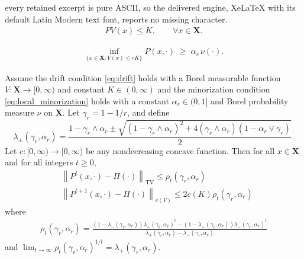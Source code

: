 \documentclass[10pt,a4paper]{amsart}
\newcommand{\X}{\textbf{X}}
\begin{document}
every retained excerpt is pure ASCII, so the delivered engine, XeLaTeX with its default Latin Modern text font, reports no missing character.
\begin{align}
P V(x) \le K, \qquad \forall x \in \X.
\label{eq:drift}
\end{align}

\begin{align}
\inf_{\{x \in \X : V(x) \le rK\}} P(x, \cdot) \;\ge\; \alpha_r \, \nu(\cdot).
\label{eq:local_minorization}
\end{align}

\begin{theorem}  \label{thm:convergence_sharp}
Assume the drift condition \eqref{eq:drift} holds with a Borel measurable function $V : \X \to [0, \infty)$ and constant $K \in (0,\infty)$ and the minorization condition \eqref{eq:local_minorization} holds with a constant $\alpha_r \in (0, 1]$ and Borel probability measure $\nu$ on $\X$.
Let $\gamma_r = 1 - 1/r$, and define
\[
\lambda_{\pm}(\gamma_r, \alpha_r)
= \frac{1 - \gamma_r \wedge \alpha_r \pm \sqrt{ (1 - \gamma_r \wedge \alpha_r)^2 + 4 ( \gamma_r \wedge \alpha_r ) (1 - \alpha_r \vee \gamma_r) } }{2}.
\]
Let $c : [0, \infty) \to [0, \infty)$ be any nondecreasing concave function.
Then for all $x \in \X$ and for all integers $t \ge 0$,
\begin{align*}
&\left\| P^{t}(x, \cdot) - \Pi(\cdot) \right\|_{\mathrm{TV}}
\le \rho_t(\gamma_r, \alpha_r)
\\
&\left\| P^{t + 1}(x, \cdot) - \Pi(\cdot) \right\|_{c(V)}
\le 2 c(K) \rho_{t}(\gamma_r, \alpha_r)
\end{align*}
where
\begin{align}
\rho_{t}(\gamma_r, \alpha_r)
= \frac{(1 - \lambda_{-}(\gamma_r, \alpha_r)) \lambda_{+}(\gamma_r, \alpha_r)^t - (1 - \lambda_{+}(\gamma_r, \alpha_r)) \lambda_{-}(\gamma_r, \alpha_r)^t }{ \lambda_{+}(\gamma_r, \alpha_r) - \lambda_{-}(\gamma_r, \alpha_r) }
\label{eq:sharp_rate}
\end{align}
and $\lim_{t \to \infty} \rho_{t}(\gamma_r, \alpha_r)^{1/t} = \lambda_{+}(\gamma_r, \alpha_r)$.
\end{theorem}
\end{document}
